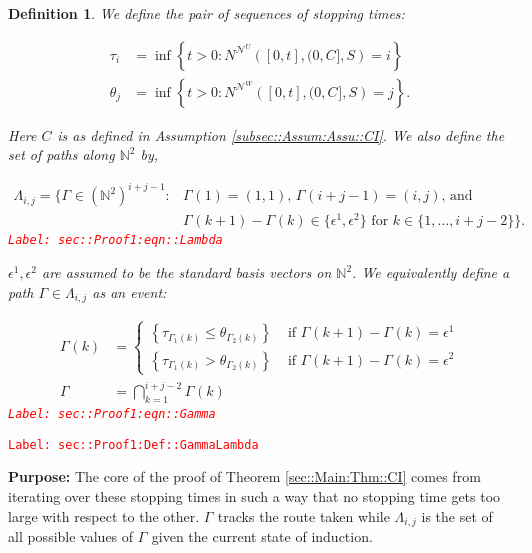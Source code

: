 \documentclass[12pt]{article}
\newcommand{\mb}{\mathbb}
\newcommand{\mc}{\mathcal}
\newcommand{\te}{\text}
\newcommand{\ep}{\epsilon}
\newcommand{\tr}{\textcolor{red}}
\newcommand{\labe}[1]{\tr{\texttt{Label: #1}}}
\newcommand{\purpose}{\textbf{Purpose: }}
\renewcommand{\U}{U}							%
\newcommand{\UU}{W}								%
\renewcommand{\S}{S}							%
\newcommand{\ev}{\ep}							%
\renewcommand{\t}{t}							%
\newcommand{\neigh}{\mc{N}}						%
\newcommand{\vind}[1]{^{#1}}					%
\newcommand{\const}{C}							%
\newcommand{\poiss}{N}							%
\newcommand{\indx}[1]{_{#1}}					%
\newcommand{\rt}{\tau}							%
\newcommand{\rtt}{\theta}						%
\renewcommand{\it}{k}							%
\newcommand{\apath}{\Gamma}						%
\newcommand{\pathset}[2]{\Lambda_{#1,#2}}		%
\newtheorem{defn}[thms]{Definition}
\begin{document}
\begin{defn}
We define the pair of sequences of stopping times:

\begin{align*}
\rt\indx{i} &= \inf \left\{\t > 0: \poiss\vind{\neigh\vind{\U}}\left([0,\t],(0,\const\indx{}],\S\right) = i\right\}\\
\rtt\indx{j} &= \inf \left\{\t > 0: \poiss\vind{\neigh\vind{\UU}}\left([0,\t],(0,\const\indx{}],\S\right) = j\right\}.
\end{align*}

Here \(\const\indx{}\) is as defined in Assumption \ref{subsec::Assum:Assu::CI}. We also define the set of paths along \(\mb{N}^2\) by,

\begin{align}
\pathset{i}{j} = \{\apath\indx{} \in (\mb{N}^2)^{i+j-1}: &\apath\indx{}(1) = (1,1)\te{, } \apath\indx{}(i+j-1) = (i,j)\te{, and } \nonumber\\
&\apath\indx{}(\it+1) - \apath\indx{}(\it)\in \{\ev\vind{1},\ev\vind{2}\}\te{ for }\it\in \{1,\dots, i+j-2\}\}.
\label{sec::Proof1:eqn::Lambda}
\end{align}
\labe{sec::Proof1:eqn::Lambda}

\(\ev\vind{1},\ev\vind{2}\) are assumed to be the standard basis vectors on \(\mb{N}^2\). We equivalently define a path \(\apath\indx{} \in \pathset{i}{j}\) as an event:

\begin{align}
\apath\indx{}(\it) &= \begin{cases}
\left\{\rt\indx{\apath\indx{1}(\it)} \leq \rtt\indx{\apath\indx{2}(\it)}\right\} &\te{ if } \apath\indx{}(\it+1) - \apath\indx{}(\it) = \ev\vind{1}\\
\left\{\rt\indx{\apath\indx{1}(\it)} > \rtt\indx{\apath\indx{2}(\it)}\right\} &\te{ if } \apath\indx{}(\it+1) - \apath\indx{}(\it) = \ev\vind{2}
\end{cases}\\
\apath\indx{} &= \bigcap_{\it=1}^{i+j-2} \apath\indx{}(\it)
\label{sec::Proof1:eqn::Gamma}
\end{align}
\labe{sec::Proof1:eqn::Gamma}
\label{sec::Proof1:Def::GammaLambda}
\end{defn}
\labe{sec::Proof1:Def::GammaLambda}

\purpose The core of the proof of Theorem \ref{sec::Main:Thm::CI} comes from iterating over these stopping times in such a way that no stopping time gets too large with respect to the other. \(\apath\indx{}\) tracks the route taken while \(\pathset{i}{j}\) is the set of all possible values of \(\apath\indx{}\) given the current state of induction.
\end{document}
